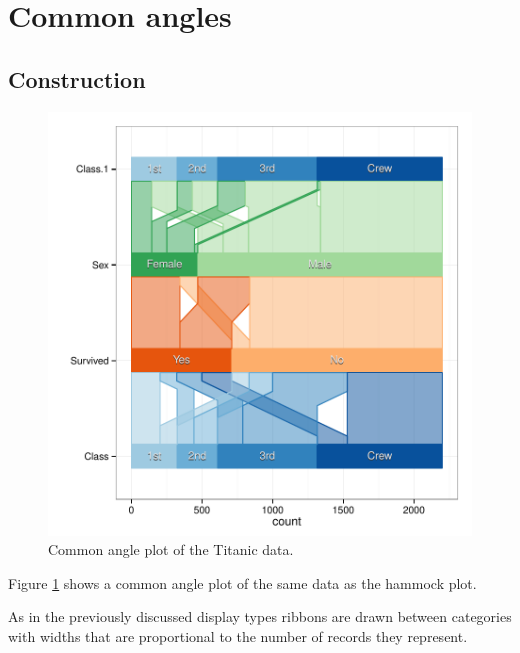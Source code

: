 \section{Common angles}


\subsection{Construction}


\begin{figure}[htbp] %
   \centering
   \includegraphics[width=\linewidth]{images/ca-titanic} 
   \caption{ \label{fig:ca-titanic} Common angle plot of the Titanic data. }
  \end{figure}

Figure \ref{fig:ca-titanic} shows a common angle plot of the same data as the hammock plot.

As in the previously discussed display types ribbons are drawn between categories with widths  that are proportional to  the number of records they represent.

